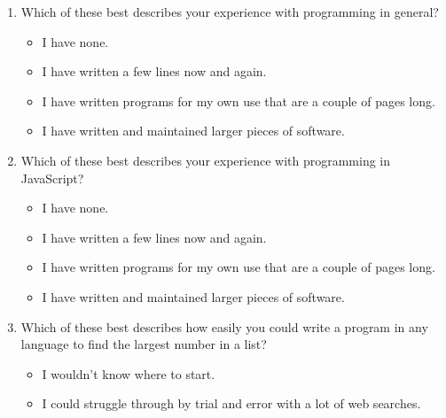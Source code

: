 \begin{enumerate}

\item
  Which of these best describes
  your experience with programming in general?

  \begin{itemize}
    
  \item
    I have none.
    
  \item
    I have written a few lines now and again.
    
  \item
    I have written programs for my own use that are a couple of
    pages long.
    
  \item
    I have written and maintained larger pieces of software.\\
    
  \end{itemize}

\item
  Which of these best describes
  your experience with programming in JavaScript?

  \begin{itemize}
    
  \item
    I have none.
    
  \item
    I have written a few lines now and again.
    
  \item
    I have written programs for my own use that are a couple of
    pages long.
    
  \item
    I have written and maintained larger pieces of software.\\
    
  \end{itemize}

\item
  Which of these best describes how easily you could write a program
  in any language
  to find the largest number in a list?

  \begin{itemize}
    
  \item
    I wouldn't know where to start.
    
  \item
    I could struggle through by trial and error with a lot of web
    searches.
    

\end{itemize}
\end{enumerate}
